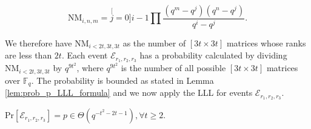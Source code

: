 \begin{equation}
\mathrm{NM}_{i,n,m}=\stackrel[j=0]{i-1}{\mathop{\prod}}\frac{\left(q^{m}-q^{j}\right)\left(q^{n}-q^{j}\right)}{q^{i}-q^{j}}.\label{eq:num_of_rank_t_matrices}
\end{equation}

We therefore have $\mathrm{NM}_{i<2t,3t,3t}$ as the number of $\left[3t\times3t\right]$
matrices whose ranks are less than $2t$. Each event $\mathcal{E}_{r_{1},r_{2},r_{3}}$
has a probability calculated by dividing $\mathrm{NM}_{i<2t,3t,3t}$
by $q^{9t^{2}}$, where $q^{9t^{2}}$ is the number of all possible
$\left[3t\times3t\right]$ matrices over $\ensuremath{\mathbb{F}}_{q}$.
The probability is bounded as stated in Lemma \ref{lem:prob_p_LLL_formula}
and we now apply the LLL for events $\mathcal{E}_{r_{1},r_{2},r_{3}}$.
\begin{lem}
\label{lem:prob_p_LLL_formula} $\mathrm{Pr}\left[\mathcal{E}_{r_{1},r_{2},r_{3}}\right]=p\in\Theta\left(q^{-t^{2}-2t-1}\right),\forall t\geq2.$
\end{lem}
